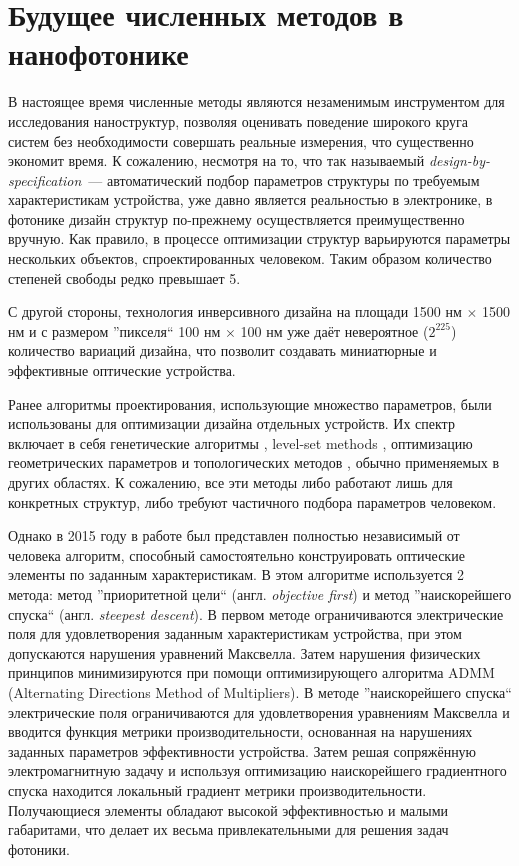 \section{Будущее численных методов в нанофотонике}

В настоящее время численные методы являются незаменимым инструментом для исследования наноструктур, позволяя оценивать поведение широкого круга систем без необходимости совершать реальные измерения, что существенно экономит время. К сожалению, несмотря на то, что  так называемый {\it design-by-specification}~--- автоматический подбор параметров структуры по требуемым характеристикам устройства, уже давно является реальностью в электронике, в фотонике дизайн структур по-прежнему осуществляется преимущественно вручную. Как правило, в процессе оптимизации структур варьируются параметры нескольких объектов, спроектированных человеком. Таким образом количество степеней свободы редко превышает 5.

С другой стороны, технология инверсивного дизайна на площади 1500 нм $\times$ 1500 нм и с размером ''пикселя`` 100 нм $\times$ 100 нм уже даёт невероятное ($2^{225}$) количество вариаций дизайна, что позволит создавать миниатюрные и эффективные оптические устройства.

Ранее алгоритмы проектирования, использующие множество параметров, были использованы для оптимизации дизайна отдельных устройств. Их спектр включает в себя генетические алгоритмы \cite{Gondarenko2008}, level-set methods \cite{Kao2005}, оптимизацию геометрических параметров \cite{Seliger2006} и топологических методов \cite{Elesin2012}, обычно применяемых в других областях. К сожалению, все эти методы либо работают лишь для конкретных структур, либо требуют частичного подбора параметров человеком. 

Однако в 2015 году в работе \cite{Piggott2015} был представлен полностью независимый от человека алгоритм, способный самостоятельно конструировать оптические элементы по заданным характеристикам. В этом алгоритме используется 2 метода: метод ''приоритетной цели`` (англ. {\it objective first}) и метод ''наискорейшего спуска`` (англ. {\it steepest descent}). В первом методе ограничиваются электрические поля для удовлетворения заданным характеристикам устройства, при этом допускаются нарушения уравнений Максвелла. Затем нарушения физических принципов минимизируются при помощи оптимизирующего алгоритма ADMM (Alternating Directions Method of Multipliers). В методе ''наискорейшего спуска`` электрические поля ограничиваются для удовлетворения уравнениям Максвелла и вводится функция метрики производительности, основанная на нарушениях заданных параметров эффективности устройства. Затем решая сопряжённую электромагнитную задачу и используя оптимизацию наискорейшего градиентного спуска находится локальный градиент метрики производительности. Получающиеся элементы обладают высокой эффективностью и малыми габаритами, что делает их весьма привлекательными для решения задач фотоники.